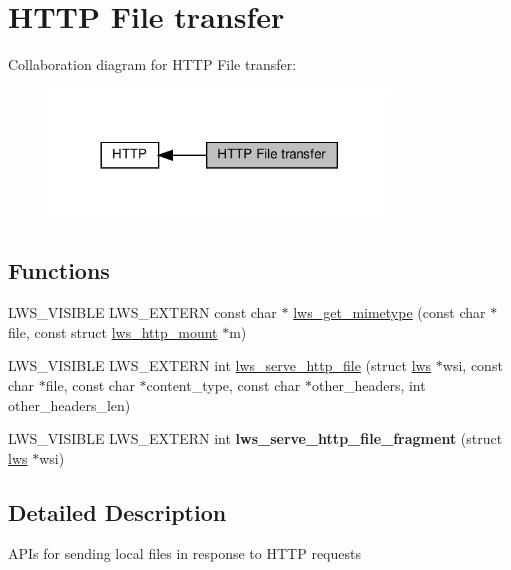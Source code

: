 \hypertarget{group__httpft}{}\section{H\+T\+TP File transfer}
\label{group__httpft}
Collaboration diagram for H\+T\+TP File transfer\+:
\nopagebreak
\begin{figure}[H]
\begin{center}
\leavevmode
\includegraphics[width=257pt]{group__httpft}
\end{center}
\end{figure}
\subsection*{Functions}
\begin{DoxyCompactItemize}
\item 
L\+W\+S\+\_\+\+V\+I\+S\+I\+B\+LE L\+W\+S\+\_\+\+E\+X\+T\+E\+RN const char $\ast$ \hyperlink{group__httpft_gab4da87a4800413f15e7aba649fb1d77c}{lws\+\_\+get\+\_\+mimetype} (const char $\ast$file, const struct \hyperlink{structlws__http__mount}{lws\+\_\+http\+\_\+mount} $\ast$m)
\item 
L\+W\+S\+\_\+\+V\+I\+S\+I\+B\+LE L\+W\+S\+\_\+\+E\+X\+T\+E\+RN int \hyperlink{group__httpft_gab393a06d3d2722af4c3f8b06842c80d7}{lws\+\_\+serve\+\_\+http\+\_\+file} (struct \hyperlink{structlws}{lws} $\ast$wsi, const char $\ast$file, const char $\ast$content\+\_\+type, const char $\ast$other\+\_\+headers, int other\+\_\+headers\+\_\+len)
\item 
\mbox{\label{group__httpft_ga29e1123f6d56cd777b3e5bf9ca40f9e5}} 
L\+W\+S\+\_\+\+V\+I\+S\+I\+B\+LE L\+W\+S\+\_\+\+E\+X\+T\+E\+RN int {\bfseries lws\+\_\+serve\+\_\+http\+\_\+file\+\_\+fragment} (struct \hyperlink{structlws}{lws} $\ast$wsi)
\end{DoxyCompactItemize}


\subsection{Detailed Description}
A\+P\+Is for sending local files in response to H\+T\+TP requests 

